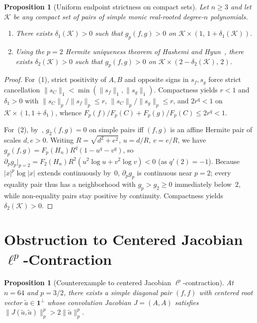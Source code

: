 \documentclass[11pt]{article}
\theoremstyle{plain}
\newtheorem{proposition}[theorem]{Proposition}
\theoremstyle{definition}
\theoremstyle{remark}
\newcommand{\one}{\mathbf{1}}
\begin{document}
\begin{proposition}[Uniform endpoint strictness on compact sets]\label{prop:endpoints}
Let $n \ge 3$ and let $\mathcal{K}$ be any compact set of pairs of simple monic real-rooted degree-$n$ polynomials.
\begin{enumerate}[label=\textup{(\arabic*)}]
\item There exists $\delta_1(\mathcal{K}) > 0$ such that $g_p(f,g) > 0$ on $\mathcal{K} \times (1,\, 1+\delta_1(\mathcal{K}))$.
\item Using the $p = 2$ Hermite uniqueness theorem of Hashemi and Hyun~\cite{HashemiHyun2026}, there exists $\delta_2(\mathcal{K}) > 0$ such that $g_p(f,g) > 0$ on $\mathcal{K} \times (2-\delta_2(\mathcal{K}),\, 2)$.
\end{enumerate}
\end{proposition}

\begin{proof}
For~(1), strict positivity of $A, B$ and opposite signs in $s_f, s_g$ force strict cancellation $\|s_C\|_1 < \min(\|s_f\|_1, \|s_g\|_1)$. Compactness yields $r < 1$ and $\delta_1 > 0$ with $\|s_C\|_p / \|s_f\|_p \le r$, $\|s_C\|_p / \|s_g\|_p \le r$, and $2 r^q < 1$ on $\mathcal{K} \times (1, 1+\delta_1)$, whence $F_p(f)/F_p(C) + F_p(g)/F_p(C) \le 2r^q < 1$.

For~(2), by~\cite{HashemiHyun2026}, $g_2(f,g) = 0$ on simple pairs iff $(f,g)$ is an affine Hermite pair of scales $d, e > 0$. Writing $R = \sqrt{d^2+e^2}$, $u = d/R$, $v = e/R$, we have $g_p(f,g) = F_p(H_n) R^q (1 - u^q - v^q)$, so $\partial_p g_p|_{p=2} = F_2(H_n) R^2 (u^2 \log u + v^2 \log v) < 0$ (as $q'(2) = -1$). Because $|x|^p \log |x|$ extends continuously by~$0$, $\partial_p g_p$ is continuous near $p = 2$; every equality pair thus has a neighborhood with $g_p > g_2 \ge 0$ immediately below~$2$, while non-equality pairs stay positive by continuity. Compactness yields $\delta_2(\mathcal{K}) > 0$.
\end{proof}

\section{Obstruction to Centered Jacobian \texorpdfstring{$\ell^p$}{lp}-Contraction}

\begin{proposition}[Counterexample to centered Jacobian $\ell^p$-contraction]\label{prop:obstruction}
At $n = 64$ and $p = 3/2$, there exists a simple diagonal pair $(f,f)$ with centered root vector $\tilde{a} \in \one^\perp$ whose convolution Jacobian $J = (A,A)$ satisfies $\|J(\tilde{a},\tilde{a})\|_p^p > 2\|\tilde{a}\|_p^p$.
\end{proposition}
\end{document}
